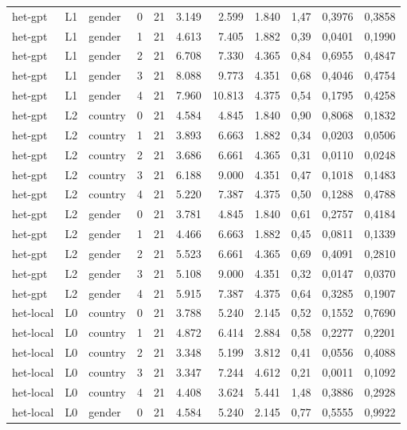 \begin{landscape}
\begin{longtable}{lllrrrrrrrr}
het-gpt & L1 & gender & 0 & 21 & 3.149 & 2.599 & 1.840 & 1,47 & 0,3976 & 0,3858 \\
het-gpt & L1 & gender & 1 & 21 & 4.613 & 7.405 & 1.882 & 0,39 & 0,0401 & 0,1990 \\
het-gpt & L1 & gender & 2 & 21 & 6.708 & 7.330 & 4.365 & 0,84 & 0,6955 & 0,4847 \\
het-gpt & L1 & gender & 3 & 21 & 8.088 & 9.773 & 4.351 & 0,68 & 0,4046 & 0,4754 \\
het-gpt & L1 & gender & 4 & 21 & 7.960 & 10.813 & 4.375 & 0,54 & 0,1795 & 0,4258 \\
het-gpt & L2 & country & 0 & 21 & 4.584 & 4.845 & 1.840 & 0,90 & 0,8068 & 0,1832 \\
het-gpt & L2 & country & 1 & 21 & 3.893 & 6.663 & 1.882 & 0,34 & 0,0203 & 0,0506 \\
het-gpt & L2 & country & 2 & 21 & 3.686 & 6.661 & 4.365 & 0,31 & 0,0110 & 0,0248 \\
het-gpt & L2 & country & 3 & 21 & 6.188 & 9.000 & 4.351 & 0,47 & 0,1018 & 0,1483 \\
het-gpt & L2 & country & 4 & 21 & 5.220 & 7.387 & 4.375 & 0,50 & 0,1288 & 0,4788 \\
het-gpt & L2 & gender & 0 & 21 & 3.781 & 4.845 & 1.840 & 0,61 & 0,2757 & 0,4184 \\
het-gpt & L2 & gender & 1 & 21 & 4.466 & 6.663 & 1.882 & 0,45 & 0,0811 & 0,1339 \\
het-gpt & L2 & gender & 2 & 21 & 5.523 & 6.661 & 4.365 & 0,69 & 0,4091 & 0,2810 \\
het-gpt & L2 & gender & 3 & 21 & 5.108 & 9.000 & 4.351 & 0,32 & 0,0147 & 0,0370 \\
het-gpt & L2 & gender & 4 & 21 & 5.915 & 7.387 & 4.375 & 0,64 & 0,3285 & 0,1907 \\
het-local & L0 & country & 0 & 21 & 3.788 & 5.240 & 2.145 & 0,52 & 0,1552 & 0,7690 \\
het-local & L0 & country & 1 & 21 & 4.872 & 6.414 & 2.884 & 0,58 & 0,2277 & 0,2201 \\
het-local & L0 & country & 2 & 21 & 3.348 & 5.199 & 3.812 & 0,41 & 0,0556 & 0,4088 \\
het-local & L0 & country & 3 & 21 & 3.347 & 7.244 & 4.612 & 0,21 & 0,0011 & 0,1092 \\
het-local & L0 & country & 4 & 21 & 4.408 & 3.624 & 5.441 & 1,48 & 0,3886 & 0,2928 \\
het-local & L0 & gender & 0 & 21 & 4.584 & 5.240 & 2.145 & 0,77 & 0,5555 & 0,9922 \\

\end{longtable}
\end{landscape}
